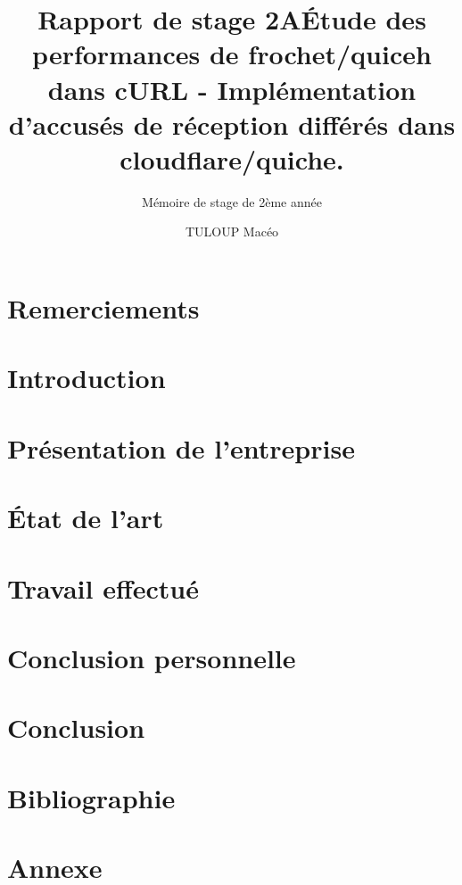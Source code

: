 \documentclass{rapport_de_stage}
\title{Rapport de stage 2A} %
\title{Étude des performances de frochet/quiceh dans cURL - Implémentation d'accusés de réception différés dans cloudflare/quiche.}
\subtitle{Mémoire de stage de 2ème année}
\author{TULOUP Macéo}
\begin{document}
\maketitle

\section{Remerciements}

\newpage



\newpage

\toc %



\section{Introduction}

\newpage


\section{Présentation de l'entreprise}

\newpage


\section{État de l'art}

\newpage


\section{Travail effectué}

\newpage


\section{Conclusion personnelle}

\newpage


\section{Conclusion} 

\newpage


\section{Bibliographie}

\newpage


\section{Annexe}

\newpage
\end{document}
